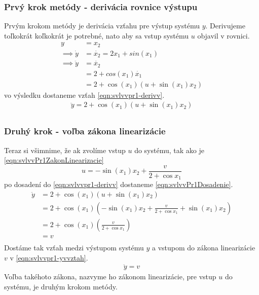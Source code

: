 \documentclass[../main.tex]{subfiles}
\begin{document}
    \subsubsection*{Prvý krok metódy - derivácia rovnice výstupu}
    Prvým krokom metódy je derivácia vzťahu pre výstup systému $y$. Derivujeme toľkokrát koľkokrát je potrebné, nato aby sa vstup systému $u$ objavil v rovnici.
	\begin{equation*}
	\begin{aligned}
		y &= x_2 \\ 
		\implies \dot{y}  &= \dot{x_2} =  2x_1 + sin(x_1) \\
		\implies \ddot{y} &= \ddot{x_2} \\
						  &= 2 + cos(x_1)\dot{x_1} \\
						  &= 2 + \cos(x_1)(u + \sin(x_1) x_2)
		\end{aligned}
		\label{eqn:}
	\end{equation*}
    vo výsledku dostaneme vzťah \cref{eqn:svlvvpr1-derivv}.
    \begin{equation}
        \begin{aligned}
            \ddot{y} = 2 + \cos(x_1)(u + \sin(x_1) x_2) \\
        \end{aligned}
        \label{eqn:svlvvpr1-derivv}
    \end{equation} 

    \subsubsection*{Druhý krok - voľba zákona linearizácie}
	Teraz si všimnime, že ak zvolíme vstup $u$ do systému, tak ako je \cref{eqn:svlvvPr1ZakonLinearizacie} 
	\begin{equation}
	    u = -\sin(x_1) x_2  +  \frac{v}{2 + \cos x_1}
	    \label{eqn:svlvvPr1ZakonLinearizacie}
	\end{equation}
po dosadení do \cref{eqn:svlvvpr1-derivv} dostaneme \cref{eqn:svlvvPr1Dosadenie}.
	\begin{equation*}
	\begin{aligned}
	 	\ddot{y} &= 2 + \cos(x_1)(u + \sin(x_1) x_2) \\
	 		     &= 2 + \cos(x_1)(-\sin(x_1) x_2  +  \frac{v}{2 + \cos x_1} + \sin(x_1) x_2)  \\ 
	 		     &= 2 + \cos(x_1)(\frac{v}{2 + \cos x_1})  \\ 
	 		     &= v  \\ 
 	\end{aligned}
	\label{eqn:svlvvPr1Dosadenie}
	\end{equation*}
    Dostáme tak vzťah medzi výstupom systému $y$ a vstupom do zákona linearizácie $v$ v \cref{eqn:svlvvpr1-yvvztah}.
    \begin{equation}
        \begin{aligned}
            \ddot{y} = v
        \end{aligned}
        \label{eqn:svlvvpr1-yvvztah}
    \end{equation} 
     Voľba takéhoto zákona, nazvyme ho zákonom linearizácie, pre vstup $u$ do systému, je druhým krokom metódy.
\end{document}
